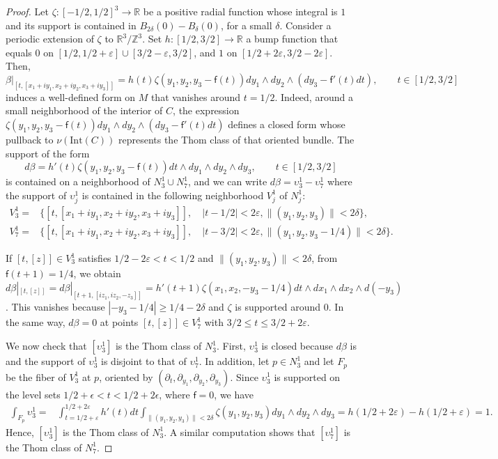 \documentclass[10pt]{article}
\newcommand{\e}{\varepsilon}
\newcommand{\R}{\mathbb R}
\newcommand{\Z}{\mathbb Z}
\theoremstyle{plain}
\theoremstyle{definition}
\theoremstyle{remark}
\begin{document}
\begin{proof}
Let  $\zeta \colon [-1/2,1/2]^3 \to \R$ be a positive radial function whose integral is $1$ and its support is contained in $B_{2\delta}(0)-B_{\delta}(0)$, for a small $\delta$. Consider a periodic extension of $\zeta$ to $\R^3/\Z^3$.
Set $h\colon [1/2,3/2]\to \R$ a bump function that equals $0$ on $[1/2,1/2+\e]\cup[3/2-\e,3/2]$, and $1$ on $[1/2+2\e,3/2-2\e]$. Then, 
\begin{equation} \label{eqn:beta}
\beta|_{[t,[x_1+iy_1,x_2+iy_2,x_3+iy_3]]}= h(t)\zeta(y_1,y_2,y_3-\mathsf{f}(t))dy_1\wedge dy_2 \wedge (dy_3-\mathsf{f}'(t)dt), \qquad t\in [1/2,3/2]
\end{equation}
induces a well-defined form on $M$ that vanishes around $t=1/2$. Indeed, around a small neighborhood of the interior of $C$, the expression
$
\zeta(y_1,y_2,y_3-\mathsf{f}(t)) dy_1\wedge dy_2 \wedge (dy_3-\mathsf{f}'(t)dt) 
$
defines a closed form whose pullback to $\nu(\mathrm{Int}(C))$ represents the Thom class of that oriented bundle. The support of the form
$$
d\beta= h'(t) \zeta(y_1,y_2,y_3-\mathsf{f}(t)) dt\wedge dy_1\wedge dy_2 \wedge dy_3, \qquad t\in [1/2,3/2]
$$
 is contained on a neighborhood of $N_3^1\cup N_7^1$, and we can write $d\beta= \upsilon_3^1-\upsilon_7^1$ where the support of $\upsilon_j^1$ is contained in the following neighborhood $V_j^1$ of $N_j^1$:
 \begin{align*}
V_3^1=&\{ [t,[x_1 +iy_1,x_2+iy_2,x_3+iy_3]], \quad |t-1/2|<2\e , \|(y_1,y_2,y_3) \|<2\delta  \}, \\
V_7^1=&\{ [t,[x_1 +iy_1,x_2+iy_2,x_3+iy_3]], \quad |t-3/2|<2\e , \|(y_1,y_2,y_3-1/4) \|<2\delta  \} .  
 \end{align*}
 
If $[t,[z]]\in V_3^1$ satisfies $1/2-2\e < t<1/2$ and  $\|(y_1,y_2,y_3) \|<2\delta$, from $\mathsf{f}(t+1)=1/4$, we obtain
 $d\beta|_{[t,[z]]}=d\beta|_{[t+1,[iz_1,iz_2,-z_3]]}= h'(t+1)\zeta(x_1,x_2,-y_3-1/4)dt\wedge dx_1\wedge dx_2 \wedge d(-y_3)$. This vanishes because $|-y_3-1/4|\geq 1/4-2\delta$ and $\zeta$ is supported around $0$.
 In the same way, $d\beta=0$ at points $[t,[z]]\in V_7^1$ with $3/2\leq t \leq 3/2+2\e$.
 
We now check that $[\upsilon_3^1]$ is the Thom class of $N_3^1$. First,
$\upsilon_3^1$ is closed because $d\beta$ is and the support of $\upsilon_3^1$ is disjoint to that of $\upsilon_7^1$. In addition, let $p \in N_3^1$ and let $F_p$ be the fiber of $V_3^1$ at $p$, oriented by $(\partial_t, \partial_{y_1}, \partial_{y_2}, \partial_{y_3})$. Since
$\upsilon_3^1$ is supported on the level sets  $1/2+\epsilon<t<1/2+2\epsilon$, where $\mathsf{f}=0$, we have
\begin{align*}
\int_{F_p}{\upsilon_3^1}=& \int_{t=1/2+\e}^{1/2+2\e}{h'(t)dt} \int_{\|(y_1,y_2,y_3) \|<2\delta}{\zeta(y_1,y_2,y_3) dy_1\wedge dy_2 \wedge dy_3}
= h(1/2+2\e)-h(1/2+\e)=1.
\end{align*}
Hence, $[\upsilon_3^1]$ is the Thom class of $N_3^1$. 
A similar computation shows that $[\upsilon_7^1]$ is the Thom class of $N_7^1$.


\end{proof}
\end{document}

